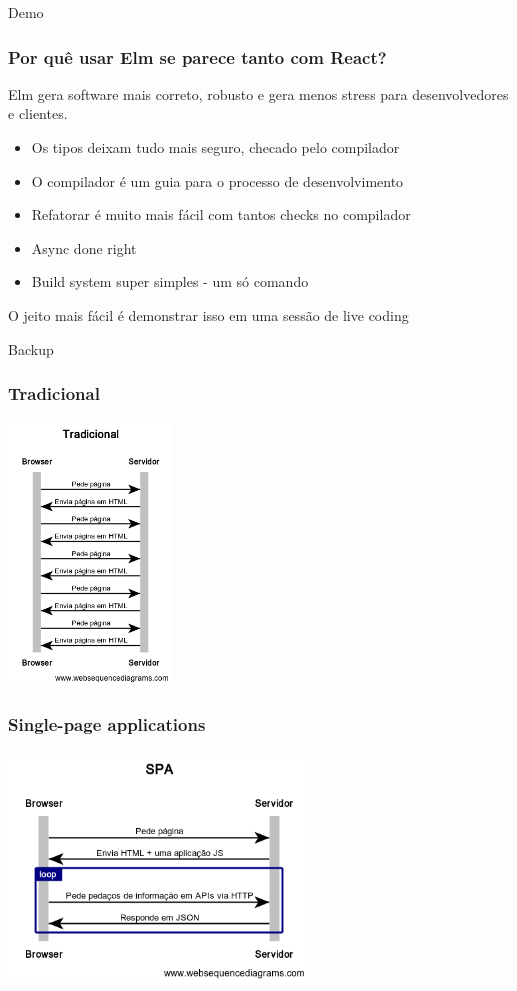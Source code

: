 \documentclass[10pt]{beamer}
\begin{document}
\begin{frame}
	\Huge{Demo}
\end{frame}

\begin{frame}
	\frametitle{Por quê usar Elm se parece tanto com React?}
	Elm gera software mais correto, robusto e gera menos stress para desenvolvedores e clientes.
	\medskip
	\begin{itemize}
		\item Os tipos deixam tudo mais seguro, checado pelo compilador
		\item O compilador é um guia para o processo de desenvolvimento
		\item Refatorar é muito mais fácil com tantos checks no compilador
		\item Async done right
		\item Build system super simples - um só comando
	\end{itemize}
	\medskip
	O jeito mais fácil é demonstrar isso em uma sessão de live coding
\end{frame}

\begin{frame}
	\huge Backup
\end{frame}

\begin{frame}
	\frametitle{Tradicional}
	\begin{center}
		\includegraphics[height=70mm]{tradicional.png}
	\end{center}
\end{frame}

\begin{frame}
	\frametitle{Single-page applications}
	\begin{center}
		\includegraphics[width=80mm]{spa.png}
	\end{center}
\end{frame}
\end{document}
